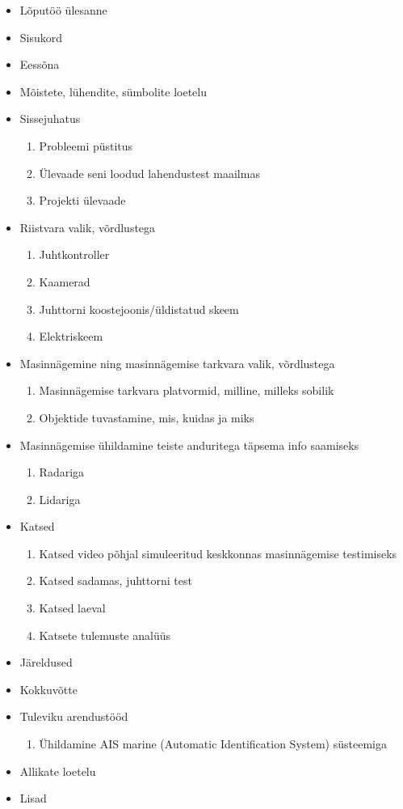 \begin{itemize}
  \item Lõputöö ülesanne
  \item Sisukord
  \item Eessõna
  \item Mõistete, lühendite, sümbolite loetelu
  \item Sissejuhatus
    \begin{enumerate}
      \item Probleemi püstitus
      \item Ülevaade seni loodud lahendustest maailmas
      \item Projekti ülevaade
    \end{enumerate}
  \item Riistvara valik, võrdlustega
    \begin{enumerate}
      \item Juhtkontroller
      \item Kaamerad
      \item Juhttorni koostejoonis/üldistatud skeem
      \item Elektriskeem
    \end{enumerate}
  \item Masinnägemine ning masinnägemise tarkvara valik, võrdlustega
    \begin{enumerate}
      \item Masinnägemise tarkvara platvormid, milline, milleks sobilik
      \item Objektide tuvastamine, mis, kuidas ja miks
    \end{enumerate}
  \item Masinnägemise ühildamine teiste anduritega täpsema info saamiseks
    \begin{enumerate}
      \item Radariga
      \item Lidariga
    \end{enumerate}
  \item Katsed
    \begin{enumerate}
      \item Katsed video põhjal simuleeritud keskkonnas masinnägemise testimiseks
      \item Katsed sadamas, juhttorni test
      \item Katsed laeval
      \item Katsete tulemuste analüüs
    \end{enumerate}
  \item Järeldused
  \item Kokkuvõtte
  \item Tuleviku arendustööd
    \begin{enumerate}
      \item Ühildamine AIS marine (Automatic Identification System) süsteemiga
    \end{enumerate}
  \item Allikate loetelu
  \item Lisad
\end{itemize}


